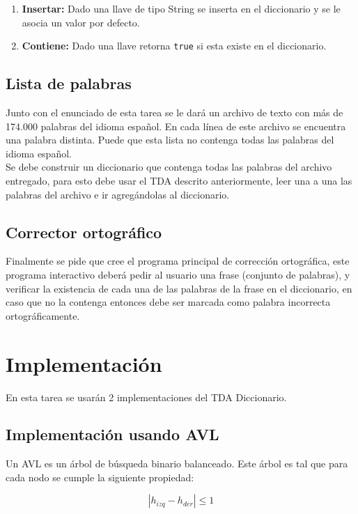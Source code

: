 \documentclass[dcc]{fcfmcourse}
\begin{document}
\begin{enumerate}
    \item \textbf{Insertar:} Dado una llave de tipo String se inserta en el diccionario y se le asocia un valor por defecto.
    \item \textbf{Contiene:} Dado una llave retorna \texttt{true} si esta existe en el diccionario.
\end{enumerate}

\subsection{Lista de palabras}
Junto con el enunciado de esta tarea se le dará un archivo de texto con más de 174.000 palabras del idioma español. En cada línea de este archivo se encuentra una palabra distinta. Puede que esta lista no contenga todas las palabras del idioma español. \\

Se debe construir un diccionario que contenga todas las palabras del archivo entregado, para esto debe usar el TDA descrito anteriormente, leer una a una las palabras del archivo e ir agregándolas al diccionario. \\

\subsection{Corrector ortográfico}
Finalmente se pide que cree el programa principal de corrección ortográfica, este programa interactivo deberá pedir al usuario una frase (conjunto de palabras), y verificar la existencia de cada una de las palabras de la frase en el diccionario, en caso que no la contenga entonces debe ser marcada como palabra incorrecta ortográficamente.

\newpage
\section{Implementación}

En esta tarea se usarán 2 implementaciones del TDA Diccionario.

\subsection{Implementación usando AVL}
Un AVL es un árbol de búsqueda binario balanceado. Este árbol es tal que para cada nodo se cumple la siguiente propiedad:

\begin{equation*}
    |h_{izq} - h_{der}| \leq 1
\end{equation*}
\end{document}
